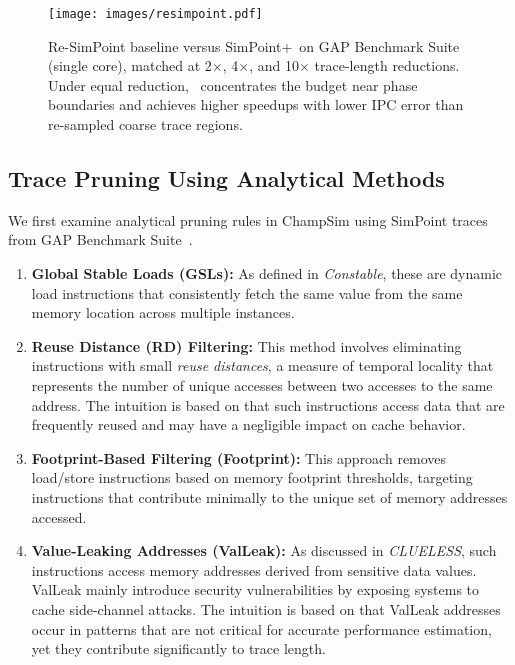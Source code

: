 \begin{figure}[!htbp]
    \centering
    \setlength{\belowcaptionskip}{-10pt}
    \captionsetup{skip=0pt}
    \captionsetup[subfigure]{font=footnotesize, skip=1pt}
    \texttt{[image: images/resimpoint.pdf]}
    \caption{Re-SimPoint baseline versus SimPoint+\name\ on GAP Benchmark Suite (single core), matched at 2$\times$, 4$\times$, and 10$\times$ trace-length reductions.  Under equal reduction, \name\ concentrates the budget near phase boundaries and achieves higher speedups with lower IPC error than re-sampled coarse trace regions.}
    \label{fig:re-simpoint}
\end{figure}

\subsection*{Trace Pruning Using Analytical Methods}
We first examine analytical pruning rules in ChampSim using SimPoint traces from GAP Benchmark Suite~\cite{beamer2017gapbenchmarksuite}.
\begin{enumerate}[nosep, leftmargin=*]
    \item \textbf{Global Stable Loads (GSLs):} As defined in \textit{Constable}\cite{constable}, these are dynamic load instructions that consistently fetch the same value from the same memory location across multiple instances.  
    \item \textbf{Reuse Distance (RD) Filtering:} This method involves eliminating instructions with small \emph{reuse distances}, a measure of temporal locality that represents the number of unique accesses between two accesses to the same address. The intuition is based on that such instructions access  data that are frequently reused and may have a negligible impact on cache behavior.
    \item \textbf{Footprint-Based Filtering (Footprint):} This approach removes load/store instructions based on memory footprint thresholds, targeting instructions that contribute minimally to the unique set of memory addresses accessed.
    \item \textbf{Value-Leaking Addresses (ValLeak):} As discussed in \emph{CLUELESS}\cite{clueless}, such instructions access memory addresses derived from sensitive data values. ValLeak mainly introduce security vulnerabilities by exposing systems to cache side-channel attacks. { The intuition is based on that ValLeak addresses occur in patterns that are not critical for accurate performance estimation, yet they contribute significantly to trace length.}
\end{enumerate} 


